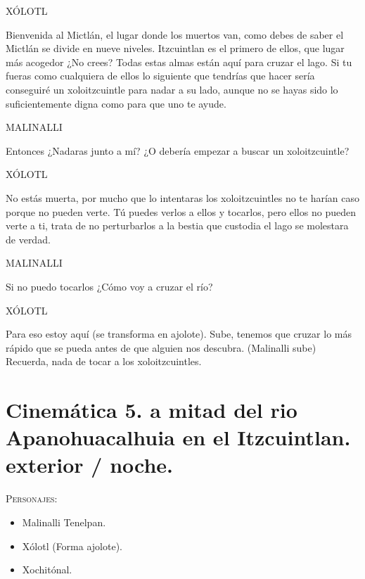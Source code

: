 \documentclass[11pt,letterpaper]{article}
\begin{document}
\begin{center}
XÓLOTL
\\
\par
Bienvenida al Mictlán, el lugar donde los muertos van, como debes de saber el Mictlán se divide en nueve niveles. Itzcuintlan es el primero de ellos, que lugar más acogedor ¿No crees? Todas estas almas están aquí para cruzar el lago. Si tu fueras como cualquiera de ellos lo siguiente que tendrías que hacer sería conseguiré un xoloitzcuintle para nadar a su lado, aunque no se hayas sido lo suficientemente digna como para que uno te ayude.
\\
\par
MALINALLI
\\
\par
Entonces ¿Nadaras junto a mí? ¿O debería empezar a buscar un xoloitzcuintle?
\\
\par
XÓLOTL
\\
\par
No estás muerta, por mucho que lo intentaras los xoloitzcuintles no te harían caso porque no pueden verte. Tú puedes verlos a ellos y tocarlos, pero ellos no pueden verte a ti, trata de no perturbarlos a la bestia que custodia el lago se molestara de verdad.
\\
\par
MALINALLI
\\
\par
Si no puedo tocarlos ¿Cómo voy a cruzar el río?
\\
\par
XÓLOTL
\\
\par
Para eso estoy aquí (se transforma en ajolote). Sube, tenemos que cruzar lo más rápido que se pueda antes de que alguien nos descubra. (Malinalli sube) Recuerda, nada de tocar a los xoloitzcuintles.
\end{center}

\section{Cinemática 5. a mitad del rio Apanohuacalhuia en el Itzcuintlan. exterior / noche.}
 \textsc{Personajes}:

\begin{itemize}
	\item Malinalli Tenelpan.
	\item Xólotl (Forma ajolote).
	\item Xochitónal.
\end{itemize}
\end{document}
